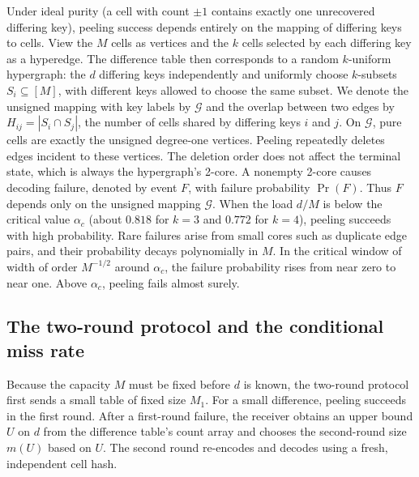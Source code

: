 Under ideal purity (a cell with count $\pm1$ contains exactly one unrecovered differing key), peeling success depends entirely on the mapping of differing keys to cells. View the $M$ cells as vertices and the $k$ cells selected by each differing key as a hyperedge. The difference table then corresponds to a random $k$-uniform hypergraph: the $d$ differing keys independently and uniformly choose $k$-subsets $S_i\subseteq[M]$, with different keys allowed to choose the same subset. We denote the unsigned mapping with key labels by $\mathcal G$ and the overlap between two edges by $H_{ij}=|S_i\cap S_j|$, the number of cells shared by differing keys $i$ and $j$. On $\mathcal G$, pure cells are exactly the unsigned degree-one vertices. Peeling repeatedly deletes edges incident to these vertices. The deletion order does not affect the terminal state, which is always the hypergraph's 2-core. A nonempty 2-core causes decoding failure, denoted by event $F$, with failure probability $\Pr(F)$. Thus $F$ depends only on the unsigned mapping $\mathcal G$. When the load $d/M$ is below the critical value $\alpha_c$ (about $0.818$ for $k=3$ and $0.772$ for $k=4$\cite{molloy,dw}), peeling succeeds with high probability. Rare failures arise from small cores such as duplicate edge pairs, and their probability decays polynomially in $M$. In the critical window of width of order $M^{-1/2}$ around $\alpha_c$, the failure probability rises from near zero to near one\cite{dm}. Above $\alpha_c$, peeling fails almost surely.

\subsection{The two-round protocol and the conditional miss rate}
Because the capacity $M$ must be fixed before $d$ is known, the two-round protocol\cite{wu2026selfsizing} first sends a small table of fixed size $M_1$. For a small difference, peeling succeeds in the first round. After a first-round failure, the receiver obtains an upper bound $U$ on $d$ from the difference table's count array and chooses the second-round size $m(U)$ based on $U$. The second round re-encodes and decodes using a fresh, independent cell hash.

